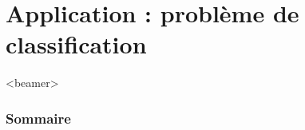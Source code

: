 \section{Application : problème de classification}

\begin{frame}<beamer>
  \frametitle{Sommaire}
  \tableofcontents[currentsection]
\end{frame}





